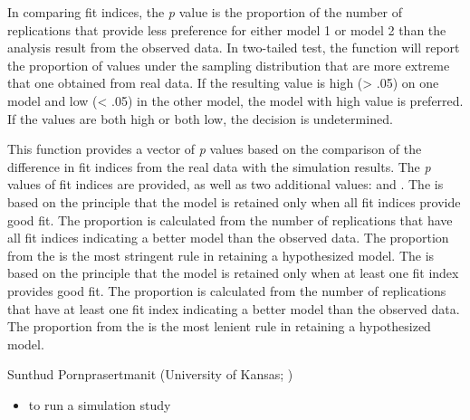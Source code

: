 \documentclass[a4paper]{book}
\begin{document}
%
\begin{Details}\relax
In comparing fit indices, the \emph{p} value is the proportion of the number of replications that provide less preference for either model 1 or model 2 than the analysis result from the observed data. In two-tailed test, the function will report the proportion of values under the sampling distribution that are more extreme that one obtained from real data. If the resulting  value is high (> .05) on one model and low (< .05) in the other model, the model with high  value is preferred. If the  values are both high or both low, the decision is undetermined.
\end{Details}
%
\begin{Value}
This function provides a vector of \emph{p} values based on the comparison of the difference in fit indices from the real data with the simulation results. The \emph{p} values of fit indices are provided, as well as two additional values:  and . The  is based on the principle that the model is retained only when all fit indices provide good fit. The proportion is calculated from the number of replications that have all fit indices indicating a better model than the observed data. The proportion from the  is the most stringent rule in retaining a hypothesized model. The  is based on the principle that the model is retained only when at least one fit index provides good fit. The proportion is calculated from the number of replications that have at least one fit index indicating a better model than the observed data. The proportion from the  is the most lenient rule in retaining a hypothesized model.
\end{Value}
%
\begin{Author}\relax
Sunthud Pornprasertmanit (University of Kansas; )
\end{Author}
%
\begin{SeeAlso}\relax
\begin{itemize}


\item {} to run a simulation study


\end{itemize}

\end{SeeAlso}
%
\end{document}
